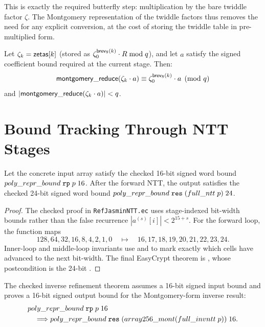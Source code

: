 This is exactly the required butterfly step: multiplication by the bare twiddle
factor $\zeta$.  The Montgomery representation of the twiddle factors thus
removes the need for any explicit conversion, at the cost of storing
the twiddle table in pre-multiplied form.

\begin{lemma}
  Let $\zeta_k = \mathsf{zetas}[k]$ (stored as $\zeta_0^{\mathsf{brev}_8(k)} \cdot R \bmod q$),
  and let \(a\) satisfy the signed coefficient bound required at the current
  stage.  Then:
  \[
    \mathsf{montgomery\_reduce}(\zeta_k \cdot a)
    \equiv \zeta_0^{\mathsf{brev}_8(k)} \cdot a \pmod{q}
  \]
  and $|\mathsf{montgomery\_reduce}(\zeta_k \cdot a)| < q$.
\label{lem:zeta_correct}
\end{lemma}

\section{Bound Tracking Through NTT Stages}

\begin{theorem}
  Let the concrete input array satisfy the checked 16-bit signed word bound
  \(poly\_repr\_bound\;\texttt{rp}\;p\;16\).  After the forward NTT,
  the output satisfies the checked 24-bit signed word bound
  \(poly\_repr\_bound\;\texttt{res}\;(full\_ntt\;p)\;24\).
\label{thm:ntt_bounds}
\end{theorem}

\begin{proof}
  The checked proof in \texttt{RefJasminNTT.ec} uses stage-indexed
  bit-width bounds rather than the false recurrence
  \(|a^{(s)}[i]| < 2^{15+s}\).  For the forward loop, the function
   maps
  \[
    128,64,32,16,8,4,2,1,0
    \quad\mapsto\quad
    16,17,18,19,20,21,22,23,24.
  \]
  Inner-loop and middle-loop invariants use  and
   to mark exactly which cells have advanced to the
  next bit-width.  The final EasyCrypt theorem is
  , whose postcondition is the 24-bit
  .
\end{proof}

\begin{corollary}
  The checked inverse refinement theorem assumes a 16-bit signed input bound
  and proves a 16-bit signed output bound for the Montgomery-form inverse
  result:
  \[
  \begin{aligned}
    &poly\_repr\_bound\;\texttt{rp}\;p\;16 \\
    &\quad\Longrightarrow
      poly\_repr\_bound\;\texttt{res}\;
      (array256\_mont(full\_invntt\;p))\;16.
  \end{aligned}
  \]
\label{cor:invntt_bounds}
\end{corollary}


